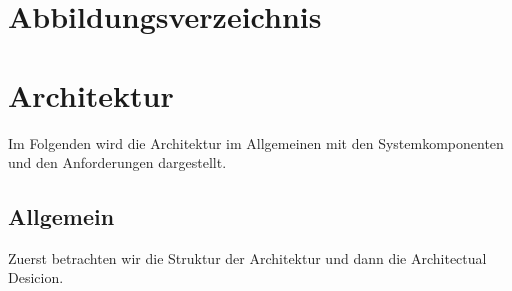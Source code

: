 \documentclass[12pt]{report}
\begin{document}
\pagestyle{plain}
\fancyhead{}


\fancyhead[C]{\nouppercase\leftmark}

\renewcommand{\footrulewidth}{0.4pt} %


\renewcommand{\sectionmark}[1]{\markboth{#1}{}} 

\newpage


\tableofcontents
{}
\thispagestyle{plain}

\newpage
\chapter*{Abbildungsverzeichnis}

\listoffigures

\addtocounter{frontmatterPage}{\value{page}} 

\newpage
{}
\chapter{Architektur}
	Im Folgenden wird die Architektur im Allgemeinen mit den Systemkomponenten und den Anforderungen dargestellt.
	\section{Allgemein}
		Zuerst betrachten wir die Struktur der Architektur und dann die Architectual Desicion.
\end{document}

